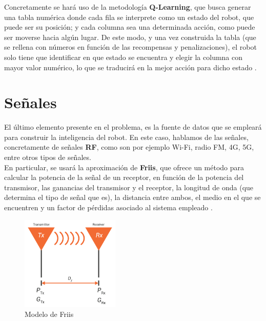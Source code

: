 Concretamente se hará uso de la metodología \textbf{Q-Learning}, que busca generar una tabla numérica donde cada fila se interprete como un estado del robot, que puede ser su posición; y cada columna sea una determinada acción, como puede ser moverse hacia algún lugar. De este modo, y una vez construida la tabla (que se rellena con números en función de las recompensas y penalizaciones), el robot solo tiene que identificar en que estado se encuentra y elegir la columna con mayor valor numérico, lo que se traducirá en la mejor acción para dicho estado \cite{q-learning}.

\newpage
\section{Señales}
\label{subsec:señales}

El último elemento presente en el problema, es la fuente de datos que se empleará para construir la inteligencia del robot. En este caso, hablamos de las señales, concretamente de señales \textbf{\ac{RF}}, como son por ejemplo Wi-Fi, radio FM, 4G, 5G, entre otros tipos de señales.\\

En particular, se usará la aproximación de \textbf{Friis}, que ofrece un método para calcular la potencia de la señal de un receptor, en función de la potencia del transmisor, las ganancias del transmisor y el receptor, la longitud de onda (que determina el tipo de señal que es), la distancia entre ambos, el medio en el que se encuentren y un factor de pérdidas asociado al sistema empleado \cite{friis-1} \cite{friis-2} \cite{friis-3}.\\

\begin{figure} [H]
	\begin{center}
	\includegraphics[height=4.5cm]{imagenes/cap1/10_friis.png}
	\end{center}
	\caption[Modelo de Friis]{Modelo de Friis}
	\label{fig:friis}
\end{figure}

